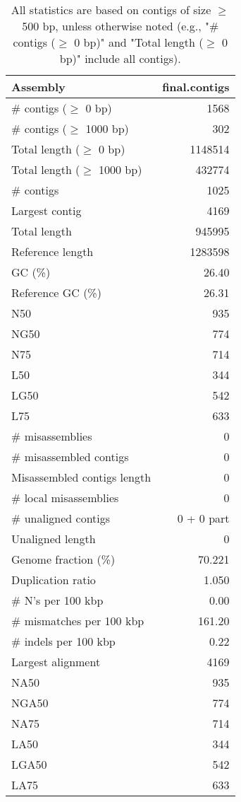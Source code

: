 \documentclass[12pt,a4paper]{article}
\begin{document}
\begin{table}[ht]
\begin{center}
\caption{All statistics are based on contigs of size $\geq$ 500 bp, unless otherwise noted (e.g., "\# contigs ($\geq$ 0 bp)" and "Total length ($\geq$ 0 bp)" include all contigs).}
\begin{tabular}{|l*{1}{|r}|}
\hline
Assembly & final.contigs \\ \hline
\# contigs ($\geq$ 0 bp) & 1568 \\ \hline
\# contigs ($\geq$ 1000 bp) & 302 \\ \hline
Total length ($\geq$ 0 bp) & 1148514 \\ \hline
Total length ($\geq$ 1000 bp) & 432774 \\ \hline
\# contigs & 1025 \\ \hline
Largest contig & 4169 \\ \hline
Total length & 945995 \\ \hline
Reference length & 1283598 \\ \hline
GC (\%) & 26.40 \\ \hline
Reference GC (\%) & 26.31 \\ \hline
N50 & 935 \\ \hline
NG50 & 774 \\ \hline
N75 & 714 \\ \hline
L50 & 344 \\ \hline
LG50 & 542 \\ \hline
L75 & 633 \\ \hline
\# misassemblies & 0 \\ \hline
\# misassembled contigs & 0 \\ \hline
Misassembled contigs length & 0 \\ \hline
\# local misassemblies & 0 \\ \hline
\# unaligned contigs & 0 + 0 part \\ \hline
Unaligned length & 0 \\ \hline
Genome fraction (\%) & 70.221 \\ \hline
Duplication ratio & 1.050 \\ \hline
\# N's per 100 kbp & 0.00 \\ \hline
\# mismatches per 100 kbp & 161.20 \\ \hline
\# indels per 100 kbp & 0.22 \\ \hline
Largest alignment & 4169 \\ \hline
NA50 & 935 \\ \hline
NGA50 & 774 \\ \hline
NA75 & 714 \\ \hline
LA50 & 344 \\ \hline
LGA50 & 542 \\ \hline
LA75 & 633 \\ \hline
\end{tabular}
\end{center}
\end{table}
\end{document}
